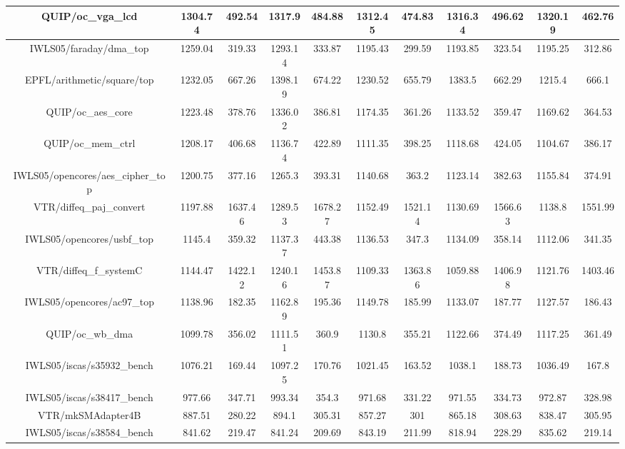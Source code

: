 {\begin{longtable}{|*{11}{c|}}
        QUIP/oc\_vga\_lcd & 1304.74 & 492.54 & 1317.9 & 484.88 & 1312.45 & 474.83 & 1316.34 & 496.62 & 1320.19 & 462.76 \\
        \hline
        IWLS05/faraday/dma\_top & 1259.04 & 319.33 & 1293.14 & 333.87 & 1195.43 & 299.59 & 1193.85 & 323.54 & 1195.25 & 312.86 \\
        \hline
        EPFL/arithmetic/square/top & 1232.05 & 667.26 & 1398.19 & 674.22 & 1230.52 & 655.79 & 1383.5 & 662.29 & 1215.4 & 666.1 \\
        \hline
        QUIP/oc\_aes\_core & 1223.48 & 378.76 & 1336.02 & 386.81 & 1174.35 & 361.26 & 1133.52 & 359.47 & 1169.62 & 364.53 \\
        \hline
        QUIP/oc\_mem\_ctrl & 1208.17 & 406.68 & 1136.74 & 422.89 & 1111.35 & 398.25 & 1118.68 & 424.05 & 1104.67 & 386.17 \\
        \hline
        IWLS05/opencores/aes\_cipher\_top & 1200.75 & 377.16 & 1265.3 & 393.31 & 1140.68 & 363.2 & 1123.14 & 382.63 & 1155.84 & 374.91 \\
        \hline
        VTR/diffeq\_paj\_convert & 1197.88 & 1637.46 & 1289.53 & 1678.27 & 1152.49 & 1521.14 & 1130.69 & 1566.63 & 1138.8 & 1551.99 \\
        \hline
        IWLS05/opencores/usbf\_top & 1145.4 & 359.32 & 1137.37 & 443.38 & 1136.53 & 347.3 & 1134.09 & 358.14 & 1112.06 & 341.35 \\
        \hline
        VTR/diffeq\_f\_systemC & 1144.47 & 1422.12 & 1240.16 & 1453.87 & 1109.33 & 1363.86 & 1059.88 & 1406.98 & 1121.76 & 1403.46 \\
        \hline
        IWLS05/opencores/ac97\_top & 1138.96 & 182.35 & 1162.89 & 195.36 & 1149.78 & 185.99 & 1133.07 & 187.77 & 1127.57 & 186.43 \\
        \hline
        QUIP/oc\_wb\_dma & 1099.78 & 356.02 & 1111.51 & 360.9 & 1130.8 & 355.21 & 1122.66 & 374.49 & 1117.25 & 361.49 \\
        \hline
        IWLS05/iscas/s35932\_bench & 1076.21 & 169.44 & 1097.25 & 170.76 & 1021.45 & 163.52 & 1038.1 & 188.73 & 1036.49 & 167.8 \\
        \hline
        IWLS05/iscas/s38417\_bench & 977.66 & 347.71 & 993.34 & 354.3 & 971.68 & 331.22 & 971.55 & 334.73 & 972.87 & 328.98 \\
        \hline
        VTR/mkSMAdapter4B & 887.51 & 280.22 & 894.1 & 305.31 & 857.27 & 301 & 865.18 & 308.63 & 838.47 & 305.95 \\
        \hline
        IWLS05/iscas/s38584\_bench & 841.62 & 219.47 & 841.24 & 209.69 & 843.19 & 211.99 & 818.94 & 228.29 & 835.62 & 219.14 \\

\end{longtable}}
